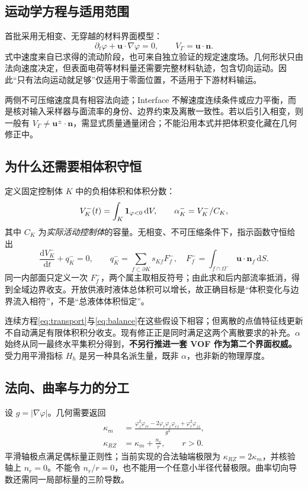 \documentclass[UTF8,a4paper,11pt,fontset=fandol]{ctexart}
\newcommand{\dd}{\,\mathrm d}
\newcommand{\uu}{\bm u}\newcommand{\nn}{\bm n}\newcommand{\xx}{\bm x}
\newcommand{\ph}{\varphi}\newcommand{\dt}{\Delta t}
\begin{document}
\subsection{运动学方程与适用范围}
首批采用无相变、无穿越的材料界面模型：
\begin{equation}
 \partial_t\ph+\uu\cdot\nabla\ph=0,
 \qquad V_\Gamma=\uu\cdot\nn.
 \label{eq:transport}
\end{equation}
式中速度来自已求得的流动阶段，也可来自独立验证的规定速度场。几何形状只由法向速度决定，但表面电荷等材料量还需要完整材料轨迹，包含切向运动。因此“只有法向运动就足够”仅适用于零面位置，不适用于下游材料输运。

两侧不可压缩速度具有相容法向迹；Interface 不解速度连续条件或应力平衡，而是核对输入采样器与面流率的身份、边界约束及离散一致性。若以后引入相变，则一般有 $V_\Gamma\ne\uu^\pm\cdot\nn$，需显式质量通量闭合；不能沿用本式并把体积变化藏在几何修正中。

\subsection{为什么还需要相体积守恒}
定义固定控制体 $K$ 中的负相体积和体积分数：
\begin{equation}
 V_K^-(t)=\int_K {\bf1}_{\ph<0}\dd V,\qquad
 \alpha_K^-=V_K^-/C_K,
 \label{eq:volume}
\end{equation}
其中 $C_K$ 为\emph{实际活动控制体}的容量。无相变、不可压缩条件下，指示函数守恒给出
\begin{equation}
 \frac{\mathrm dV_K^-}{\mathrm dt}+q_K^-=0,
 \qquad q_K^-=\sum_{f\subset\partial K}s_{Kf}F_f^-,\quad
 F_f^-=\int_{f\cap\Omega^-}\uu\cdot\nn_f\dd S.
 \label{eq:balance}
\end{equation}
同一内部面只定义一次 $F_f^-$，两个属主取相反符号；由此求和后内部流率抵消，得到全域边界收支。开放供液时液体总体积可以增长，故正确目标是“体积变化与边界流入相符”，不是“总液体体积恒定”。

连续方程\eqref{eq:transport}与\eqref{eq:balance}在这些假设下相容；但离散的点值特征线更新不自动满足有限体积积分收支。现有修正正是同时满足这两个离散要求的补充。$\alpha$ 始终从同一最终水平集积分得到，\textbf{不另行推进一套 VOF 作为第二个界面权威。}受力用平滑指标 $H_h$ 是另一种具名派生量，既非 $\alpha$，也非新的物理厚度。

\subsection{法向、曲率与力的分工}
设 $g=|\nabla\ph|$。几何需要返回
\begin{align}
 \kappa_m&=\frac{\ph_z^2\ph_{rr}-2\ph_r\ph_z\ph_{rz}+\ph_r^2\ph_{zz}}{g^3},
 \label{eq:km}\\
 \kappa_{RZ}&=\kappa_m+\frac{n_r}{r},\qquad r>0.
 \label{eq:krz}
\end{align}
平滑轴极点满足偶标量正则性；当前实现的合法轴端极限为 $\kappa_{RZ}=2\kappa_m$，并核验轴上 $n_r=0$。不能令 $n_r/r=0$，也不能用一个任意小半径代替极限。曲率切向导数还需同一局部标量的三阶导数。
\end{document}
